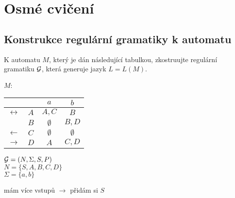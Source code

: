 \section{Osmé cvičení}

\subsection{Konstrukce regulární gramatiky k automatu}
K automatu $M$, který je dán následující tabulkou, zkostruujte regulární gramatiku $\mathcal{G}$, která generuje jazyk
$L = L(M)$.

$M$: \hspace{2mm}
\begin{multicols}{2}

    \begin{tabular}{|r c|c c|}
        \hline
        & & $a$ & $b$ \\
        \hline
        \hline
        $\leftrightarrow$&$ A$ & $A,C$ & $B$ \\
        \hline
        &$ B$ & $\emptyset$ & $B, D$ \\
        \hline
        $\leftarrow$ &$ C$ & $\emptyset$ & $\emptyset$ \\
        \hline
        $\rightarrow$&$D$ & $A$ & $C,D$ \\
        \hline
    \end{tabular}

    \vspace*{5mm}
    $\mathcal{G} = (N, \Sigma, S, P)$ \\
    $ N = \{S, A, B, C, D\}$\\
    $\Sigma = \{a, b\}$

\columnbreak
    mám více vstupů $\rightarrow$ přidám si $S$

\end{multicols}
